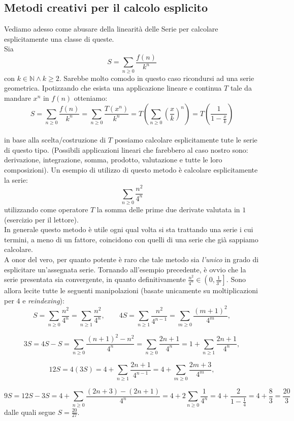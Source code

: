 \documentclass[a4paper,twoside]{article}
\newcommand{\N}{\mathbb{N}}
\theoremstyle{definition}
\numberwithin{theorem}{section}
\begin{document}
\subsection{Metodi creativi per il calcolo esplicito}
Vediamo adesso come abusare della linearità delle Serie per calcolare esplicitamente una classe di queste. \\
Sia
$$S=\sum_{n\geq 0}^{}\frac{f(n)}{k^n}$$
con $k\in\N \wedge k\geq 2$.
Sarebbe molto comodo in questo caso ricondursi ad una serie geometrica.
Ipotizzando che esista una applicazione lineare e continua $T$ tale da mandare $x^n$ in $f(n)$ otteniamo:
$$S=\sum_{n\geq 0}\frac{f(n)}{k^n}=\sum_{n\geq 0}\frac{T(x^n)}{k^n}= T\left(  \sum_{n\geq 0}\left(\frac{x}{k}\right)^n \right)= T \left(\frac{1}{1-\frac{x}{k}}\right)$$ \\
in base alla scelta/costruzione di $T$ possiamo calcolare esplicitamente tute le serie di questo tipo.
(Possibili applicazioni lineari che farebbero al caso nostro sono: derivazione, integrazione, somma, prodotto, valutazione e tutte le loro composizioni). 
Un esempio di utilizzo di questo metodo è calcolare esplicitamente la serie:
$$\sum_{n\geq 0}^{}\frac{n^2}{4^n}$$
utilizzando come operatore $T$ la somma delle prime due derivate valutata in $1$ (esercizio per il lettore).\\
In generale questo metodo è utile ogni qual volta si sta trattando una serie i cui termini, a meno di un fattore, coincidono con quelli di una serie che già sappiamo calcolare.\\
A onor del vero, per quanto potente è raro che tale metodo sia \emph{l'unico} in grado di esplicitare un'assegnata serie. 
Tornando all'esempio precedente, è ovvio che la serie presentata sia convergente, in quanto definitivamente $\frac{n^2}{4^n}\in\left(0,\frac{1}{3^n}\right]$. 
Sono allora lecite tutte le seguenti manipolazioni (basate unicamente su moltiplicazioni per $4$ e \emph{reindexing}):
$$ S=\sum_{n\geq 0}\frac{n^2}{4^n}=\sum_{n\geq 1}\frac{n^2}{4^n},\qquad 4S=\sum_{n\geq 1}\frac{n^2}{4^{n-1}}=\sum_{m\geq 0}\frac{(m+1)^2}{4^m}, $$

$$ 3S=4S-S = \sum_{n\geq 0}\frac{(n+1)^2-n^2}{4^n}=\sum_{n\geq 0}\frac{2n+1}{4^n}=1+\sum_{n\geq 1}\frac{2n+1}{4^n},$$

$$ 12S=4(3S) = 4+\sum_{n\geq 1}\frac{2n+1}{4^{n-1}} = 4+\sum_{m\geq 0}\frac{2m+3}{4^m}, $$

$$ 9S = 12S-3S = 4+\sum_{n\geq 0}\frac{(2n+3)-(2n+1)}{4^n} = 4+2\sum_{n\geq 0}\frac{1}{4^n} = 4+\frac{2}{1-\frac{1}{4}} = 4+\frac{8}{3} = \frac{20}{3} $$
dalle quali segue $S=\frac{20}{27}$.
\end{document}
